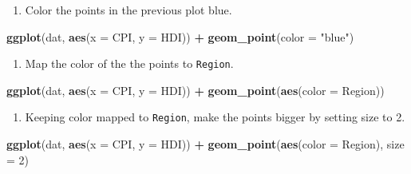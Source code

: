 \documentclass[
]{book}
\newenvironment{Shaded}{\begin{snugshade}}{\end{snugshade}}
\newcommand{\DataTypeTok}[1]{\textcolor[rgb]{0.13,0.29,0.53}{#1}}
\newcommand{\DecValTok}[1]{\textcolor[rgb]{0.00,0.00,0.81}{#1}}
\newcommand{\KeywordTok}[1]{\textcolor[rgb]{0.13,0.29,0.53}{\textbf{#1}}}
\newcommand{\NormalTok}[1]{#1}
\newcommand{\OperatorTok}[1]{\textcolor[rgb]{0.81,0.36,0.00}{\textbf{#1}}}
\newcommand{\StringTok}[1]{\textcolor[rgb]{0.31,0.60,0.02}{#1}}
\providecommand{\tightlist}{%
  \setlength{\itemsep}{0pt}\setlength{\parskip}{0pt}}
\begin{document}
\begin{enumerate}
\def\labelenumi{\arabic{enumi}.}
\setcounter{enumi}{1}
\tightlist
\item
  Color the points in the previous plot blue.
\end{enumerate}

\begin{Shaded}
\begin{Highlighting}[]
\KeywordTok{ggplot}\NormalTok{(dat, }\KeywordTok{aes}\NormalTok{(}\DataTypeTok{x =}\NormalTok{ CPI, }\DataTypeTok{y =}\NormalTok{ HDI)) }\OperatorTok{+}
\StringTok{  }\KeywordTok{geom_point}\NormalTok{(}\DataTypeTok{color =} \StringTok{"blue"}\NormalTok{)}
\end{Highlighting}
\end{Shaded}

\begin{enumerate}
\def\labelenumi{\arabic{enumi}.}
\setcounter{enumi}{2}
\tightlist
\item
  Map the color of the the points to \texttt{Region}.
\end{enumerate}

\begin{Shaded}
\begin{Highlighting}[]
\KeywordTok{ggplot}\NormalTok{(dat, }\KeywordTok{aes}\NormalTok{(}\DataTypeTok{x =}\NormalTok{ CPI, }\DataTypeTok{y =}\NormalTok{ HDI)) }\OperatorTok{+}
\StringTok{  }\KeywordTok{geom_point}\NormalTok{(}\KeywordTok{aes}\NormalTok{(}\DataTypeTok{color =}\NormalTok{ Region))}
\end{Highlighting}
\end{Shaded}

\begin{enumerate}
\def\labelenumi{\arabic{enumi}.}
\setcounter{enumi}{3}
\tightlist
\item
  Keeping color mapped to \texttt{Region}, make the points bigger by setting size to 2.
\end{enumerate}

\begin{Shaded}
\begin{Highlighting}[]
\KeywordTok{ggplot}\NormalTok{(dat, }\KeywordTok{aes}\NormalTok{(}\DataTypeTok{x =}\NormalTok{ CPI, }\DataTypeTok{y =}\NormalTok{ HDI)) }\OperatorTok{+}
\StringTok{  }\KeywordTok{geom_point}\NormalTok{(}\KeywordTok{aes}\NormalTok{(}\DataTypeTok{color =}\NormalTok{ Region), }\DataTypeTok{size =} \DecValTok{2}\NormalTok{)}
\end{Highlighting}
\end{Shaded}
\end{document}

